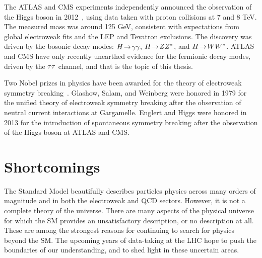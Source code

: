 The ATLAS and CMS experiments independently announced the observation of the Higgs boson in 2012~\cite{HIGG-2012-27,2012.cms-higgs}, using data taken with proton collisions at 7 and 8 TeV. The measured mass was around 125 GeV, consistent with expectations from global electroweak fits and the LEP and Tevatron exclusions. The discovery was driven by the bosonic decay modes: $H \!\rightarrow\! \gamma\gamma$, $H \!\rightarrow\! ZZ^\ast$, and $H \!\rightarrow\! WW^\ast$. ATLAS and CMS have only recently unearthed evidence for the fermionic decay modes, driven by the $\tau\tau$ channel, and that is the topic of this thesis.

Two Nobel prizes in physics have been awarded for the theory of electroweak symmetry breaking~\cite{nobelprizes}. Glashow, Salam, and Weinberg were honored in 1979 for the unified theory of electroweak symmetry breaking after the observation of neutral current interactions at Gargamelle. Englert and Higgs were honored in 2013 for the introduction of spontaneous symmetry breaking after the observation of the Higgs boson at ATLAS and CMS.

\section{Shortcomings}

The Standard Model beautifully describes particles physics across many orders of magnitude and in both the electroweak and QCD sectors. However, it is not a complete theory of the universe. There are many aspects of the physical universe for which the SM provides an unsatisfactory description, or no description at all. These are among the strongest reasons for continuing to search for physics beyond the SM. The upcoming years of data-taking at the LHC hope to push the boundaries of our understanding, and to shed light in these uncertain areas.

